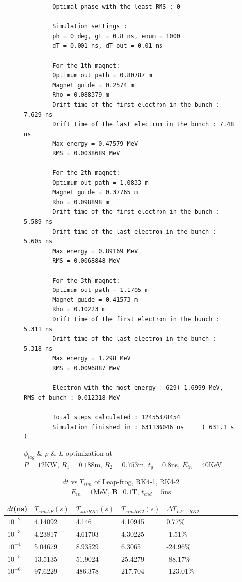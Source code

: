 \documentclass[a4paper,oneside,12pt]{report}
\numberwithin{equation}{chapter}
\begin{document}
\begin{figure}[H]
    \centering
    \captionsetup{justification=centering}
    \begin{verbatim}
        Optimal phase with the least RMS : 0

        Simulation settings : 
        ph = 0 deg, gt = 0.8 ns, enum = 1000
        dT = 0.001 ns, dT_out = 0.01 ns
        
        For the 1th magnet:
        Optimum out path = 0.80787 m
        Magnet guide = 0.2574 m
        Rho = 0.088379 m
        Drift time of the first electron in the bunch : 7.629 ns
        Drift time of the last electron in the bunch : 7.48 ns
        Max energy = 0.47579 MeV
        RMS = 0.0038689 MeV
        
        For the 2th magnet:
        Optimum out path = 1.0833 m
        Magnet guide = 0.37765 m
        Rho = 0.098898 m
        Drift time of the first electron in the bunch : 5.589 ns
        Drift time of the last electron in the bunch : 5.605 ns
        Max energy = 0.89169 MeV
        RMS = 0.0068848 MeV
        
        For the 3th magnet:
        Optimum out path = 1.1705 m
        Magnet guide = 0.41573 m
        Rho = 0.10223 m
        Drift time of the first electron in the bunch : 5.311 ns
        Drift time of the last electron in the bunch : 5.318 ns
        Max energy = 1.298 MeV
        RMS = 0.0096887 MeV
        
        Electron with the most energy : 629) 1.6999 MeV,	RMS of bunch : 0.012318 MeV
        
        Total steps calculated : 12455378454
        Simulation finished in : 631136046 us     ( 631.1 s )        
    \end{verbatim}
\caption{$\phi_{lag}$ \& $\rho$ \& $L$ optimization at \\$P=12$KW, $R_1=0.188$m, $R_2=0.753$m, $t_g=0.8$ns, $E_{in}=40$KeV}
\label{fig:lout_opt_08ns_Erms}
\end{figure}

\begin{table}[H]
    \centering
    \begin{tabular}{|l|l|l|l|l|l|l|l|l|l|}
    \hline
        $dt$(ns) & $T_{sim LF}(s)$ & $T_{sim RK1}(s)$  & $T_{sim RK2}(s)$  & $\Delta T_{LF-RK2}$\\\hline
        $10^{-2}$ & 4.14092 & 4.146 & 4.10945 & 0.77\% \\ \hline
        $10^{-3}$ & 4.23817 & 4.61703 & 4.30225 & -1.51\% \\ \hline
        $10^{-4}$ & 5.04679 & 8.93529 & 6.3065 & -24.96\% \\ \hline
        $10^{-5}$ & 13.5135 & 51.9024 & 25.4279 & -88.17\%\\ \hline
        $10^{-6}$ & 97.6229 & 486.378 & 217.704 & -123.01\% \\ \hline
    \end{tabular}
    \caption{$dt$ vs $T_{sim}$ of Leap-frog, RK4-1, RK4-2 \\$E_{in}=1$MeV, \textbf{B}=$0.1$T, $t_{end}=5$ns}
    \label{tab:lf_rk1_rk2_Tsim}
\end{table}
\end{document}
